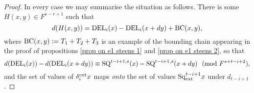 \documentclass[11pt]{amsart} \renewcommand{\baselinestretch}{1.2}
\theoremstyle{plain}
\newtheorem{cor}[thm]{Corollary}
\numberwithin{equation}{section} %
\theoremstyle{plain}
\newtheorem{cor}[thm]{Corollary}
\numberwithin{equation}{chapter} %
\newcommand{\Sq}{\mathrm{Sq}}
\newcommand{\E}[5]{[E^{#1}_{#2}#3]^{#4}_{#5}}
\begin{document}
\begin{second quadrant homotopy sseq operations}
\begin{proof}
In every case we may summarise the situation as follows. There is some $H(x,y)\in F^{s-r+1}$ such that
\[
d(H(x,y))
=
\textup{DEL}_i(x)-\textup{DEL}_i(x+dy)+\textup{BC}(x,y),%
\]
where $\textup{BC}(x,y):=T_1+T_2+T_3$ is an example of the bounding chain appearing in the proof of propositions \ref{prop on e1 steens 1} and \ref{prop on e1 steens 2}, so that
\[d(\textup{DEL}_i(x))-d(\textup{DEL}_i(x+dy))
\equiv
\textup{SQ}^{t-i+1,s}(x)-\textup{SQ}^{t-i+1,s}(x+dy) \textup{\ \ (mod $F^{s+t-i+2}$)},\]
%
and the set of values of $\delta_i^\textup{ext}x$ maps \emph{onto} the set of values $\Sq_\textup{ext}^{t-i+1}x$ under $d_{t-i+1}$.
\end{proof}
%
%


\end{second quadrant homotopy sseq operations}
\end{document}
